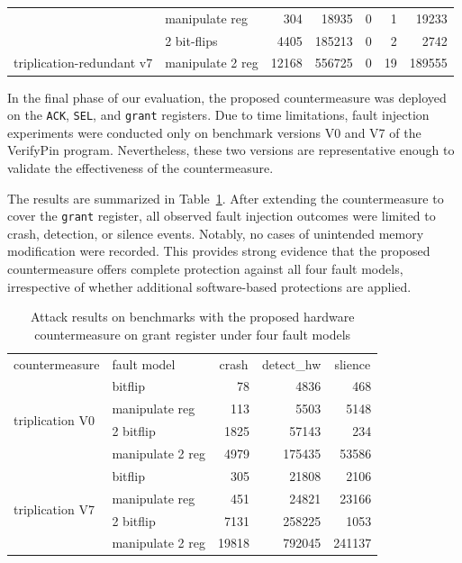 \begin{table}
\begin{tabular}{llrrrrr}
                                              & manipulate reg   & 304                                               & 18935                                                  & 0 & 1                                                 & 19233                                               \\
                                              & 2 bit-flips        & 4405                                              & 185213                                                 & 0 & 2                                                  & 2742                                                \\
\multirow{-4}{*}{triplication-redundant v7} & manipulate 2 reg & 12168                                             & 556725                                                 & 0 & 19                                                 & 189555 \\                               \hline             
\end{tabular}
\end{table}


In the final phase of our evaluation, the proposed countermeasure was deployed on the \texttt{ACK}, \texttt{SEL}, and \texttt{grant} registers. Due to time limitations, fault injection experiments were conducted only on benchmark versions V0 and V7 of the VerifyPin program. Nevertheless, these two versions are representative enough to validate the effectiveness of the countermeasure.

The results are summarized in Table~\ref{tab:complement}. After extending the countermeasure to cover the \texttt{grant} register, all observed fault injection outcomes were limited to crash, detection, or silence events. Notably, no cases of unintended memory modification were recorded. This provides strong evidence that the proposed countermeasure offers complete protection against all four fault models, irrespective of whether additional software-based protections are applied.

\begin{table}[]
  \centering
  \caption{Attack results on benchmarks with the proposed hardware countermeasure on grant register under four fault models}
  \label{tab:complement}
\begin{tabular}{llrrr}
countermeasure & fault model & \multicolumn{1}{c}{crash} & \multicolumn{1}{c}{detect\_hw} & \multicolumn{1}{c}{slience} \\
\multirow{4}{*}{triplication V0} & bitflip & 78 & 4836 & 468 \\
 & manipulate reg & 113 & 5503 & 5148 \\
 & 2 bitflip & 1825 & 57143 & 234 \\
 & manipulate 2 reg & 4979 & 175435 & 53586 \\
\multirow{4}{*}{triplication V7} & bitflip & 305 & 21808 & 2106 \\
 & manipulate reg & 451 & 24821 & 23166 \\
 & 2 bitflip & 7131 & 258225 & 1053 \\
 & manipulate 2 reg & 19818 & 792045 & 241137
\end{tabular}
\end{table}

